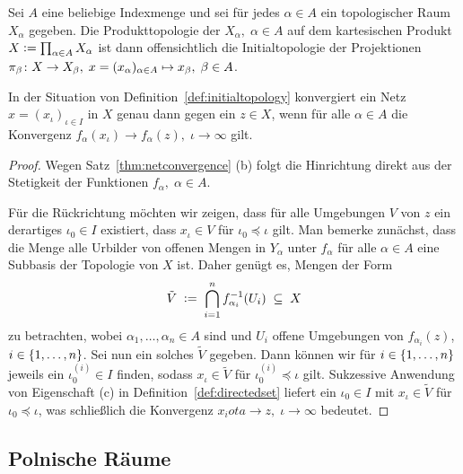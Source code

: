\documentclass[../main/main.tex]{subfiles}
\begin{document}
	\begin{Bemerkung}
		Sei $A$ eine beliebige Indexmenge und sei für jedes $\alpha \in A$ ein topologischer Raum $X_\alpha$ gegeben. Die Produkttopologie der $X_\alpha, \; \alpha \in A$
		auf dem kartesischen Produkt $X \vcentcolon = \prod_{\alpha \in A} X_\alpha$ ist dann offensichtlich die Initialtopologie der Projektionen 
		$\pi_\beta \colon X \to X_\beta, \; x = (x_\alpha)_{\alpha \in A} \mapsto x_\beta , \; \beta \in A$.
	\end{Bemerkung}
	
	\begin{Hilfssatz}
		\label{lem: convergenceinitialtopology}
		In der Situation von Definition~\ref{def:initialtopology} konvergiert ein Netz $x = (x_\iota)_{\iota \in I}$ in $X$ genau dann gegen ein $z \in X$, wenn für alle $\alpha \in A$
		die Konvergenz $f_\alpha(x_\iota) \to f_\alpha(z), \; \iota \to \infty$ gilt.
	\end{Hilfssatz}

	\begin{proof}
		Wegen Satz~\ref{thm:netconvergence} (b) folgt die Hinrichtung direkt aus der Stetigkeit der Funktionen $f_\alpha, \; \alpha \in A$.
		
		Für die Rückrichtung möchten wir zeigen, dass für alle Umgebungen $V$ von $z$ ein derartiges $\iota_0 \in I$ existiert, dass $x_\iota \in V$ für $\iota_0 \preceq \iota$ gilt.
		Man bemerke zunächst, dass die Menge alle Urbilder von offenen Mengen in $Y_\alpha$ unter $f_\alpha$ für alle $\alpha \in A$ eine Subbasis der Topologie von $X$ ist.
		Daher genügt es, Mengen der Form
		\[ \tilde{V} \; \vcentcolon = \; \bigcap_{i=1}^{n} f_{\alpha_i}^{-1}(U_i) \; \subseteq \; X \]
		zu betrachten, wobei $\alpha_1, \dots, \alpha_n \in A$ sind und $U_i$ offene Umgebungen von $f_{\alpha_i}(z)$, $i \in \left\{1, \dots, n\right\}$.
		Sei nun ein solches $\tilde{V}$ gegeben. Dann können wir für $i \in \left\{1, \dots, n\right\}$ jeweils ein $\iota_0^{(i)} \in I$ finden, sodass $x_\iota \in \tilde{V}$ für 
		$\iota_0^{(i)} \preceq \iota$ gilt. Sukzessive Anwendung von Eigenschaft (c) in Definition~\ref{def:directedset} liefert ein $\iota_0 \in I$ mit 
		$x_\iota \in \tilde{V}$ für $\iota_0 \preceq \iota$, was schließlich die Konvergenz $x_iota \to z, \; \iota \to \infty$ bedeutet.
	\end{proof}
	
	\subsection{Polnische Räume}
	
\end{document}
